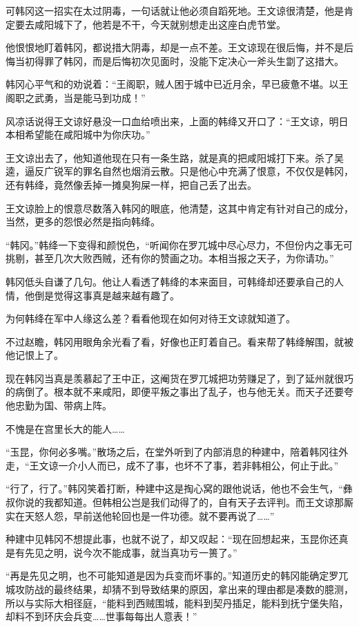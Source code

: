 可韩冈这一招实在太过阴毒，一句话就让他必须自蹈死地。王文谅很清楚，他是肯定要去咸阳城下了，他若是不干，今天就别想走出这座白虎节堂。

他恨恨地盯着韩冈，都说措大阴毒，却是一点不差。王文谅现在很后悔，并不是后悔当初得罪了韩冈，而是后悔初次见面时，没能下定决心一斧头生劏了这措大。

韩冈心平气和的劝说着：“王阁职，贼人困于城中已近月余，早已疲惫不堪。以王阁职之武勇，当是能马到功成！”

风凉话说得王文谅好悬没一口血给喷出来，上面的韩绛又开口了：“王文谅，明日本相希望能在咸阳城中为你庆功。”

王文谅出去了，他知道他现在只有一条生路，就是真的把咸阳城打下来。杀了吴逵，逼反广锐军的罪名自然也烟消云散。只是他心中充满了恨意，不仅仅是韩冈，还有韩绛，竟然像丢掉一摊臭狗屎一样，把自己丢了出去。

王文谅脸上的恨意尽数落入韩冈的眼底，他清楚，这其中肯定有针对自己的成分，当然，更多的怨恨必然是指向韩绛。

“韩冈。”韩绛一下变得和颜悦色，“听闻你在罗兀城中尽心尽力，不但份内之事无可挑剔，甚至几次大败西贼，还有你的赞画之功。本相当报之天子，为你请功。”

韩冈低头自谦了几句。他让人看透了韩绛的本来面目，可韩绛却还要承自己的人情，他倒是觉得这事真是越来越有趣了。

为何韩绛在军中人缘这么差？看看他现在如何对待王文谅就知道了。

不过赵瞻，韩冈用眼角余光看了看，好像也正盯着自己。看来帮了韩绛解围，就被他记恨上了。

现在韩冈当真是羡慕起了王中正，这阉货在罗兀城把功劳赚足了，到了延州就很巧的病倒了。根本就不来咸阳，即便平叛之事出了乱子，也与他无关。而天子还要夸他忠勤为国、带病上阵。

不愧是在宫里长大的能人……

“玉昆，你何必多嘴。”散场之后，在堂外听到了内部消息的种建中，陪着韩冈往外走，“王文谅一介小人而已，成不了事，也坏不了事，若非韩相公，何止于此。”

“行了，行了。”韩冈笑着打断，种建中这是掏心窝的跟他说话，他也不会生气，“彝叔你说的我都知道。但韩相公岂是我们动得了的，自有天子去评判。而王文谅那厮实在天怒人怨，早前送他轮回也是一件功德。就不要再说了……”

种建中见韩冈不想提此事，也就不说了，却又叹起：“现在回想起来，玉昆你还真是有先见之明，说今次不能成事，就当真功亏一篑了。”

“再是先见之明，也不可能知道是因为兵变而坏事的。”知道历史的韩冈能确定罗兀城攻防战的最终结果，却猜不到导致结果的原因，拿出来的理由都是凑数的臆测，所以与实际大相径庭，“能料到西贼围城，能料到契丹插足，能料到抚宁堡失陷，却料不到环庆会兵变……世事每每出人意表！”

